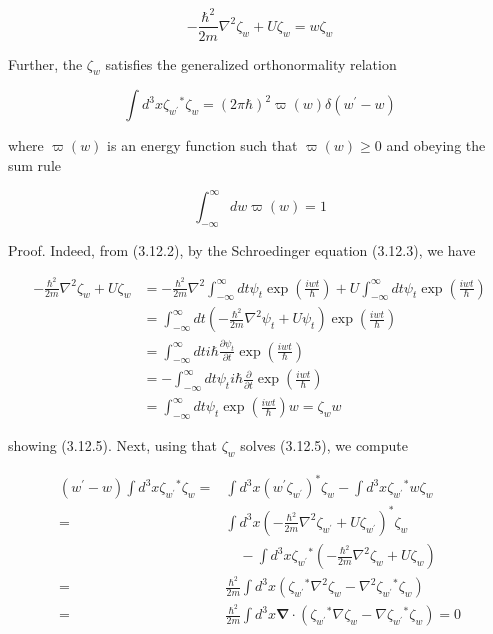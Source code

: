 \documentclass{article}
\begin{document}
\begin{equation*}
-\frac{\hbar^{2}}{2 m} \nabla^{2} \zeta_{w}+U \zeta_{w}=w \zeta_{w} \tag{3.12.5}
\end{equation*}
 

Further, the $\zeta_{w}$ satisfies the generalized orthonormality relation
 
\begin{equation*}
\int d^{3} x \zeta_{w^{\prime}}{ }^{*} \zeta_{w}=(2 \pi \hbar)^{2} \varpi(w) \delta\left(w^{\prime}-w\right) \tag{3.12.6}
\end{equation*}
 
where $\varpi(w)$ is an energy function such that $\varpi(w) \geq 0$ and obeying the sum rule
 
\begin{equation*}
\int_{-\infty}^{\infty} d w \varpi(w)=1 \tag{3.12.7}
\end{equation*}
 

Proof. Indeed, from (3.12.2), by the Schroedinger equation (3.12.3), we have
 
\begin{align*}
-\frac{\hbar^{2}}{2 m} \nabla^{2} \zeta_{w}+U \zeta_{w} & =-\frac{\hbar^{2}}{2 m} \nabla^{2} \int_{-\infty}^{\infty} d t \psi_{t} \exp \left(\frac{i w t}{\hbar}\right)+U \int_{-\infty}^{\infty} d t \psi_{t} \exp \left(\frac{i w t}{\hbar}\right) \\
& =\int_{-\infty}^{\infty} d t\left(-\frac{\hbar^{2}}{2 m} \nabla^{2} \psi_{t}+U \psi_{t}\right) \exp \left(\frac{i w t}{\hbar}\right)  \tag{3.12.8}\\
& =\int_{-\infty}^{\infty} d t i \hbar \frac{\partial \psi_{t}}{\partial t} \exp \left(\frac{i w t}{\hbar}\right) \\
& =-\int_{-\infty}^{\infty} d t \psi_{t} i \hbar \frac{\partial}{\partial t} \exp \left(\frac{i w t}{\hbar}\right) \\
& =\int_{-\infty}^{\infty} d t \psi_{t} \exp \left(\frac{i w t}{\hbar}\right) w=\zeta_{w} w
\end{align*}
 
showing (3.12.5). Next, using that $\zeta_{w}$ solves (3.12.5), we compute
 
\begin{align*}
\left(w^{\prime}-w\right) \int d^{3} x \zeta_{w^{\prime}}{ }^{*} \zeta_{w}= & \int d^{3} x\left(w^{\prime} \zeta_{w^{\prime}}\right)^{*} \zeta_{w}-\int d^{3} x \zeta_{w^{\prime}}{ }^{*} w \zeta_{w}  \tag{3.12.9}\\
= & \int d^{3} x\left(-\frac{\hbar^{2}}{2 m} \nabla^{2} \zeta_{w^{\prime}}+U \zeta_{w^{\prime}}\right)^{*} \zeta_{w} \\
& \quad-\int d^{3} x \zeta_{w^{\prime}}{ }^{*}\left(-\frac{\hbar^{2}}{2 m} \nabla^{2} \zeta_{w}+U \zeta_{w}\right) \\
= & \frac{\hbar^{2}}{2 m} \int d^{3} x\left(\zeta_{w^{\prime}}{ }^{*} \nabla^{2} \zeta_{w}-\nabla^{2} \zeta_{w^{\prime}}{ }^{*} \zeta_{w}\right) \\
= & \frac{\hbar^{2}}{2 m} \int d^{3} x \boldsymbol{\nabla} \cdot\left(\zeta_{w^{\prime}}{ }^{*} \nabla \zeta_{w}-\nabla \zeta_{w^{\prime}}{ }^{*} \zeta_{w}\right)=0
\end{align*}
 
\end{document}
